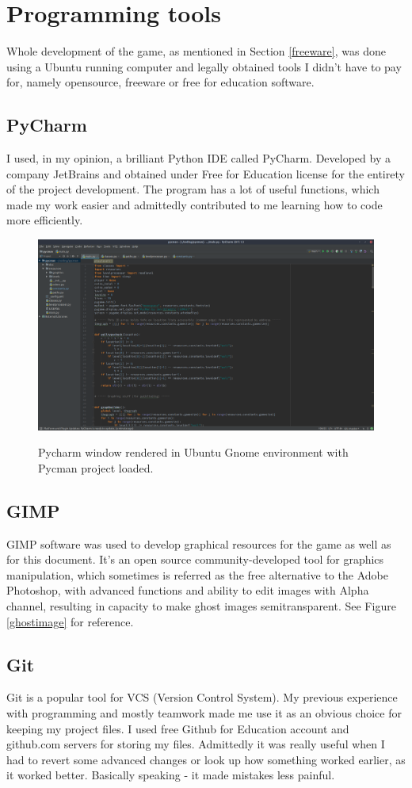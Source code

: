\documentclass[11pt,a4paper,notitlepage]{report}
\newcommand{\dsubsection}[1]{\FloatBarrier \subsection{#1}}
\newenvironment{img}{
	\begin{center}
		\begin{figure}[H]
			\begin{center}
			
}{
	\end{center}
		\end{figure}
			\end{center}
}
\begin{document}
		\section{Programming tools}
			Whole development of the game, as mentioned in Section \ref{freeware}, was done using a Ubuntu running computer and legally obtained tools I didn't have to pay for, namely opensource, freeware or free for education software.
			\dsubsection{PyCharm}
				I used, in my opinion, a brilliant Python IDE called PyCharm. Developed by a company JetBrains and obtained under Free for Education license for the entirety of the project development. The program has a lot of useful functions, which made my work easier and admittedly contributed to me learning how to code more efficiently.
				\begin{img}
					\includegraphics[width=350pt]{images/pycharm}\\
					\caption{Pycharm window rendered in Ubuntu Gnome environment with Pycman project loaded.}
				\end{img}
			\dsubsection{GIMP}
				GIMP software was used to develop graphical resources for the game as well as for this document. It's an open source community-developed tool for graphics manipulation, which sometimes is referred as the free alternative to the Adobe Photoshop, with advanced functions and ability to edit images with Alpha channel, resulting in capacity to make ghost images semitransparent. See Figure \ref{ghostimage} for reference.
			\dsubsection{Git}
				Git is a popular tool for VCS (Version Control System). My previous experience with programming and mostly teamwork made me use it as an obvious choice for keeping my project files. I used free Github for Education account and github.com servers for storing my files. Admittedly it was really useful when I had to revert some advanced changes or look up how something worked earlier, as it worked better. Basically speaking - it made mistakes less painful.
\end{document}
